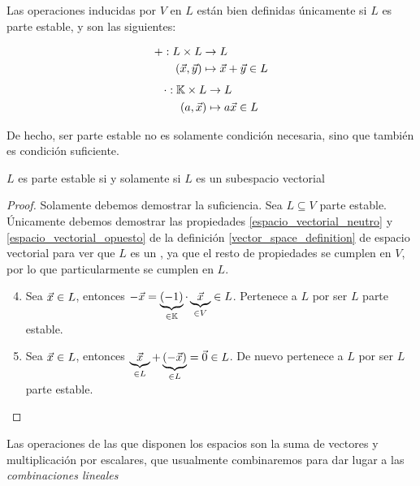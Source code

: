 \documentclass[../algebra_lineal.tex]{subfiles}
\begin{document}
\begin{remark}
    Las operaciones inducidas por $V$ en $L$ están bien definidas únicamente si $L$ es parte estable, y son las siguientes:
    \begin{multicols}{2}
        \noindent
        \begin{align*} +: L \times L &\to L \\
                (\vec{x}, \vec{y}) &\mapsto \vec{x} + \vec{y} \in L
        \end{align*}
        \noindent
        \begin{align*}
            \cdot: \mathbb{K} \times L &\to L \\
                (a, \vec{x}) &\mapsto a \vec{x} \in L
        \end{align*}
    \end{multicols} 
\end{remark}

De hecho, ser parte estable no es solamente condición necesaria, sino que también es condición suficiente.

\begin{proposition}
    $L$ es parte estable si y solamente si $L$ es un subespacio vectorial
\end{proposition}

\begin{proof}
    Solamente debemos demostrar la suficiencia. Sea $L \subseteq V$ parte estable. Únicamente debemos demostrar las propiedades \ref{espacio_vectorial_neutro} y \ref{espacio_vectorial_opuesto} de la definición \ref{vector_space_definition} de espacio vectorial para ver que $L$ es un \kvspace, ya que el resto de propiedades se cumplen en $V$, por lo que particularmente se cumplen en $L$.
    
    \begin{enumerate}
        \setcounter{enumi}{3}
        \item Sea $\vec{x} \in L$, entonces $-\vec{x} = \underbrace{(-1)}_{\in \mathbb{K}} \cdot \underbrace{\vec{x}}_{\in V} \in L$. Pertenece a $L$ por ser $L$ parte estable.
        \setcounter{enumi}{2}
        \item Sea $\vec{x} \in L$, entonces $\underbrace{\vec{x}}_{\in L} + \underbrace{(-\vec{x})}_{\in L} = \vec{0} \in L$. De nuevo pertenece a $L$ por ser $L$ parte estable.
    \end{enumerate}
    $ $
\end{proof}

Las operaciones de las que disponen los espacios son la suma de vectores y multiplicación por escalares, que usualmente combinaremos para dar lugar a las \textit{combinaciones lineales}
\end{document}
